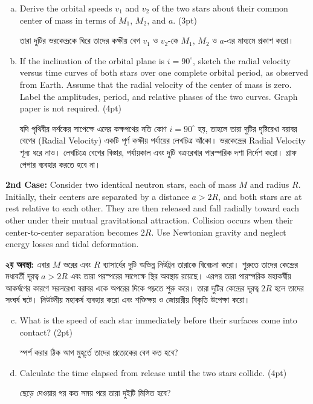 \documentclass[10pt,a5paper,twoside]{article}
\newcommand{\m}[1]{%
	\unskip\nobreak\hfill
	\mbox{\normalfont(#1pt)}%
}
\begin{document}
\begin{enumerate}[a.]
	
	\item Derive the orbital speeds $v_1$ and $v_2$ of the two stars about their common center of mass in terms of $M_1$, $M_2$, and $a$. \m{3}
	
	তারা দুটির ভরকেন্দ্রকে ঘিরে তাদের কক্ষীয় বেগ $v_1$ ও $v_2$-কে $M_1$, $M_2$ ও $a$-এর মাধ্যমে প্রকাশ করো।
	
	\item If the inclination of the orbital plane is $i=90^\circ$, sketch the radial velocity versus time curves of both stars over one complete orbital period, as observed from Earth. Assume that the radial velocity of the center of mass is zero. Label the amplitudes, period, and relative phases of the two curves. Graph paper is not required. \m{4}
	
	যদি পৃথিবীর দর্শকের সাপেক্ষে এদের কক্ষপথের নতি কোণ $i=90^\circ$ হয়, তাহলে তারা দুটির দৃষ্টিরেখা বরাবর বেগের (Radial Velocity) একটি পূর্ণ কক্ষীয় পর্যায়ের লেখচিত্র আঁকো। ভরকেন্দ্রের Radial Velocity শূন্য ধরে নাও। লেখচিত্রে বেগের বিস্তার, পর্যায়কাল এবং দুটি বক্ররেখার পারস্পরিক দশা নির্দেশ করো। গ্রাফ পেপার ব্যবহার করতে হবে না।
	
\end{enumerate}

\textbf{2nd Case:} Consider two identical neutron stars, each of mass $M$ and radius $R$. Initially, their centers are separated by a distance $a>2R$, and both stars are at rest relative to each other. They are then released and fall radially toward each other under their mutual gravitational attraction. Collision occurs when their center-to-center separation becomes $2R$. Use Newtonian gravity and neglect energy losses and tidal deformation.

\textbf{২য় অবস্থা:} এবার $M$ ভরের এবং $R$ ব্যাসার্ধের দুটি অভিন্ন নিউট্রন তারাকে বিবেচনা করো। শুরুতে তাদের কেন্দ্রের মধ্যবর্তী দূরত্ব $a>2R$ এবং তারা পরস্পরের সাপেক্ষে স্থির অবস্থায় রয়েছে। এরপর তারা পারস্পরিক মহাকর্ষীয় আকর্ষণের কারণে সরলরেখা বরাবর একে অপরের দিকে পড়তে শুরু করে। তারা দুটির কেন্দ্রের দূরত্ব $2R$ হলে তাদের সংঘর্ষ ঘটে। নিউটনীয় মহাকর্ষ ব্যবহার করো এবং শক্তিক্ষয় ও জোয়ারীয় বিকৃতি উপেক্ষা করো।

\begin{enumerate}[a.]
	\setcounter{enumi}{2}
	
	\item What is the speed of each star immediately before their surfaces come into contact? \m{2}
	
	স্পর্শ করার ঠিক আগ মুহূর্তে তাদের প্রত্যেকের বেগ কত হবে?
	
	\item Calculate the time elapsed from release until the two stars collide. \m{4}
	
	ছেড়ে দেওয়ার পর কত সময় পরে তারা দুইটি মিলিত হবে?
	
\end{enumerate}




	
\end{document}
